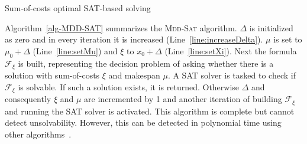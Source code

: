 \documentclass[letterpaper]{article}
\begin{document}
\begin{algorithm}[t!]
\begin{footnotesize}
\SetAlgoLined {}  \caption{Sum-of-costs optimal SAT-based solving} \label{alg-MDD-SAT}
\end{footnotesize}
\end{algorithm}





Algorithm~\ref{alg-MDD-SAT} summarizes the \textsc{Mdd-Sat} algorithm. $\Delta$ is initialized as zero and in every iteration it is increased  (Line~\ref{line:increaseDelta}). $\mu$
is set to $\mu_0+\Delta$ (Line~\ref{line:setMu}) and $\xi$ to $x_0+\Delta$ (Line~\ref{line:setXi}). Next the formula $\mathcal{F}_\xi$ is built,
representing the decision problem of asking
whether there is a solution with sum-of-costs $\xi$
and makespan $\mu$. A SAT solver is tasked to check if $\mathcal{F}_\xi$ is solvable.
If such a solution exists, it is returned. Otherwise $\Delta$ and consequently $\xi$
and $\mu$ are incremented by 1 and another iteration of building $\mathcal{F}_\xi$ and running the SAT solver is activated. This algorithm is complete
but cannot detect unsolvability. However, this can be
detected in polynomial time using other algorithms~\cite{kornhauser1984coordinating}.



\end{document}
